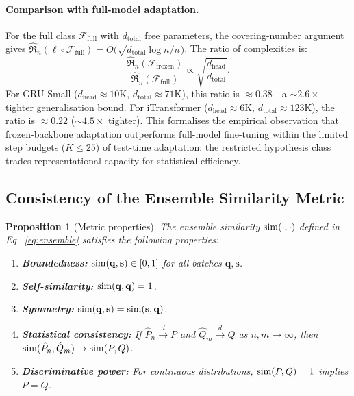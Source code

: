 \documentclass[journal]{IEEEtran}
\newtheorem{proposition}{Proposition}
\begin{document}
\paragraph{Comparison with full-model adaptation.} For the full class $\mathcal{F}_{\text{full}}$ with $d_{\text{total}}$ free parameters, the covering-number argument gives $\hat{\mathfrak{R}}_n(\ell \circ \mathcal{F}_{\text{full}}) = O\big(\sqrt{d_{\text{total}} \log n / n}\big)$. The ratio of complexities is:
\begin{equation}
    \frac{\hat{\mathfrak{R}}_n(\mathcal{F}_{\text{frozen}})}{\hat{\mathfrak{R}}_n(\mathcal{F}_{\text{full}})} \propto \sqrt{\frac{d_{\text{head}}}{d_{\text{total}}}}.
    \label{eq:complexity_ratio}
\end{equation}
For GRU-Small ($d_{\text{head}} \approx 10$K, $d_{\text{total}} \approx 71$K), this ratio is $\approx 0.38$---a ${\sim}2.6\times$ tighter generalisation bound. For iTransformer ($d_{\text{head}} \approx 6$K, $d_{\text{total}} \approx 123$K), the ratio is $\approx 0.22$ (${\sim}4.5\times$ tighter). This formalises the empirical observation that frozen-backbone adaptation outperforms full-model fine-tuning within the limited step budgets ($K \leq 25$) of test-time adaptation: the restricted hypothesis class trades representational capacity for statistical efficiency.

\subsection{Consistency of the Ensemble Similarity Metric}
\label{sec:theory_metric}

\begin{proposition}[Metric properties]
\label{prop:metric}
The ensemble similarity $\textup{sim}(\cdot, \cdot)$ defined in Eq.~\ref{eq:ensemble} satisfies the following properties:
\begin{enumerate}[nosep]
    \item \textbf{Boundedness:} $\textup{sim}(\mathbf{q}, \mathbf{s}) \in [0, 1]$ for all batches $\mathbf{q}, \mathbf{s}$.
    \item \textbf{Self-similarity:} $\textup{sim}(\mathbf{q}, \mathbf{q}) = 1$.
    \item \textbf{Symmetry:} $\textup{sim}(\mathbf{q}, \mathbf{s}) = \textup{sim}(\mathbf{s}, \mathbf{q})$.
    \item \textbf{Statistical consistency:} If $\hat{P}_n \xrightarrow{d} P$ and $\hat{Q}_m \xrightarrow{d} Q$ as $n, m \to \infty$, then $\textup{sim}(\hat{P}_n, \hat{Q}_m) \to \textup{sim}(P, Q)$.
    \item \textbf{Discriminative power:} For continuous distributions, $\textup{sim}(P, Q) = 1$ implies $P = Q$.
\end{enumerate}
\end{proposition}
\end{document}
